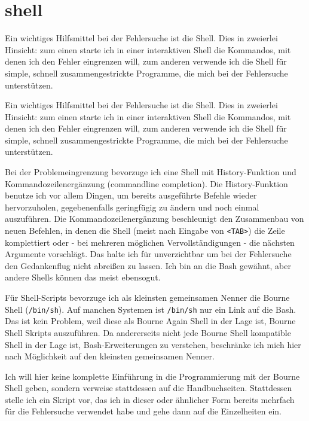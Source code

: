\section{shell}
\label{sec:lokal-werkzeuge-shell}
\begin{abstractsec}
  Ein wichtiges Hilfsmittel bei der Fehlersuche ist die Shell. Dies in
  zweierlei Hinsicht: zum einen starte ich in einer interaktiven Shell die
  Kommandos, mit denen ich den Fehler eingrenzen will, zum anderen verwende
  ich die Shell für simple, schnell zusammengestrickte Programme, die mich bei
  der Fehlersuche unterstützen.
\end{abstractsec}
\begin{normaltext}
  Ein wichtiges Hilfsmittel bei der Fehlersuche ist die Shell. Dies in
  zweierlei Hinsicht: zum einen starte ich in einer interaktiven Shell die
  Kommandos, mit denen ich den Fehler eingrenzen will, zum anderen verwende
  ich die Shell für simple, schnell zusammengestrickte Programme, die mich bei
  der Fehlersuche unterstützen.

  Bei der Problemeingrenzung bevorzuge ich eine Shell mit History-Funktion und
  Kommandozeilenergänzung (commandline completion).
  Die History-Funktion benutze ich vor allem Dingen, um bereits ausgeführte
  Befehle wieder hervorzuholen, gegebenenfalls geringfügig zu ändern und noch
  einmal auszuführen. Die Kommandozeilenergänzung beschleunigt den Zusammenbau
  von neuen Befehlen, in denen die Shell (meist nach Eingabe von \verb?<TAB>?)
  die Zeile komplettiert oder - bei mehreren möglichen Vervollständigungen -
  die nächsten Argumente vorschlägt. Das halte ich für unverzichtbar um bei
  der Fehlersuche den Gedankenflug nicht abreißen zu lassen.
  Ich bin an die Bash gewähnt, aber andere Shells können das meist ebensogut.

  Für Shell-Scripts bevorzuge ich als kleinsten gemeinsamen Nenner die Bourne
  Shell (\verb?/bin/sh?). Auf manchen Systemen ist \verb?/bin/sh? nur ein Link
  auf die Bash. Das ist kein Problem, weil diese als Bourne Again Shell in der
  Lage ist, Bourne Shell Skripts auszuführen. Da andererseits nicht jede
  Bourne Shell kompatible Shell in der Lage ist, Bash-Erweiterungen zu
  verstehen, beschränke ich mich hier nach Möglichkeit auf den kleinsten
  gemeinsamen Nenner.

  Ich will hier keine komplette Einführung in die Programmierung mit der
  Bourne Shell geben, sondern verweise stattdessen auf die Handbuchseiten.
  Stattdessen stelle ich ein Skript vor, das ich in dieser oder ähnlicher Form
  bereits mehrfach für die Fehlersuche verwendet habe und gehe dann auf die
  Einzelheiten ein.


\end{normaltext}
